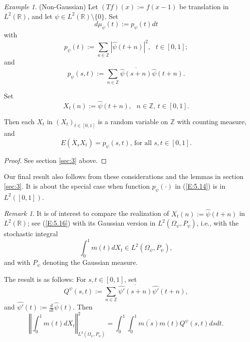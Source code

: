 \documentclass{birkmult}
\theoremstyle{definition}
\theoremstyle{remark}
\newtheorem{rem}[thm]{Remark}
\newtheorem*{ex}{Example}
\numberwithin{equation}{section}
\begin{document}
\begin{ex}
\label{ex:5.7}
(Non-Gaussian) Let $(Tf)(x) := f(x-1)$ be translation in $L^{2}(\mathbb{R})$, 
and let $\psi \in L^{2}(\mathbb{R}) \setminus \{0\}$.  Set 
\begin{equation}
\label{E:5.13}
  d\mu_{\psi}(t):=p_{\psi}(t)dt
\end{equation}
with
\begin{equation}
\label{E:5.14}
  p_{\psi}(t):= \sum_{n \in \mathbb{Z}}|\widehat{\psi}(t+n)|^{2}, \text{  }
  t \in [0,1];
\end{equation}
and 
\begin{equation}
\label{E:5.15}
  p_{\psi}(s,t):= \sum_{n \in \mathbb{Z}}\overline{\widehat{\psi}(s+n)}\widehat{\psi}(t+n).
\end{equation}
\end{ex}
Set
\begin{equation}
\label{E:5.16}
  X_{t}(n):= \widehat{\psi}(t+n), \text{   } n \in \mathbb{Z} \text{,   } 
  t \in [0,1].
\end{equation}

Then each $X_{t}$ in $(X_{t})_{t \in [0,1]}$ is a random variable on 
$\mathbb{Z}$ with counting measure, and 
\begin{equation}
\label{E:5.17}
  E(\overline{X}_{s}X_{t}) = p_{\psi}(s,t) \text{, for all } s, t \in [0,1].
\end{equation}
\begin{proof}
See section \ref{sec:3} above.
\end{proof}

Our final result also follows from these considerations and the lemmas 
in section \ref{sec:3}.  It is about the special case when function 
$p_{\psi}(\cdot)$ in (\ref{E:5.14}) is in $L^{2}([0,1])$.

\begin{rem}
\label{R:5.5}
It is of interest to compare the realization of $X_{t}(n):=\widehat{\psi}(t+n)$ 
in $L^{2}(\mathbb{R})$; see (\ref{E:5.16}) with its Gaussian version in 
$L^{2}(\Omega_{\psi}, P_{\psi})$, i.e., with the stochastic integral
\[
  \int_{0}^{1}m(t)dX_{t} \in L^{2}(\Omega_{\psi}, P_{\psi}),
\]
and with $P_{\psi}$ denoting the Gaussian measure.

The result is as follows:
\newline
For $s, t \in [0,1]$, set 
\[
  Q^{\psi}(s,t):=\sum_{n \in \mathbb{Z}} \overline{\widehat{\psi'}(s+n)}
\widehat{\psi'}(t+n),
\]
and $\widehat{\psi'}(t):=\frac{d}{dt}\widehat{\psi}(t)$.
Then 
\[
  \left\Vert\int_{0}^{1}m(t)dX_{t}\right\Vert^{2}_{L^{2}(\Omega_{\psi}, P_{\psi})}
  = \int_{0}^{1}\int_{0}^{1}\overline{m(s)}m(t)Q^{\psi}(s,t)dsdt.
\]
\end{rem}
\end{document}
